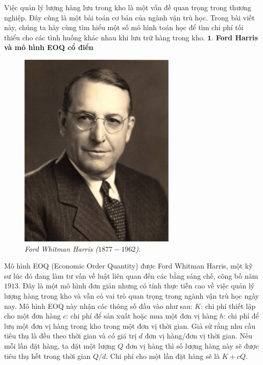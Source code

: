 \begin{multicols}{2}
	Việc quản lý lượng hàng lưu trong kho là một vấn đề quan trọng trong thương nghiệp. Đây cũng là một bài toán cơ bản của ngành vận trù học. Trong bài viết này, chúng ta hãy cùng tìm hiểu một số mô hình toán học để tìm chi phí tối thiểu cho các tình huống khác nhau khi lưu trữ hàng trong kho.
	\vskip 0.1cm
	$\pmb{1.}$ \textbf{\color{toanhocdoisong}Ford Harris và mô hình EOQ cổ điển}
	\begin{figure}[H]
		\vspace*{-5pt}
		\centering
		\captionsetup{labelformat= empty, justification=centering}
		\includegraphics[width= 0.6\linewidth]{1}
		\caption{\small\textit{\color{toanhocdoisong}Ford Whitman Harris ($1877-1962$).}}
		\vspace*{-10pt}
	\end{figure}
	Mô hình EOQ (Economic Order Quantity) được Ford Whitman Harris, một kỹ sư lúc đó đang làm tư vấn về luật liên quan đến các bằng sáng chế, công bố năm $1913$. Đây là một mô hình đơn giản nhưng có tính thực tiễn cao về việc quản lý lượng hàng trong kho và vẫn có vai trò quan trọng trong ngành vận trù học ngày nay. 
	\vskip 0.1cm
	Mô hình EOQ này nhận các thông số đầu vào như sau:
	\vskip 0.1cm
	$K$: chi phí thiết lập cho một đơn hàng
	\vskip 0.1cm
	$c$: chi phí để sản xuất hoặc mua một đơn vị hàng
	\vskip 0.1cm
	$h$: chi phí để lưu một đơn vị hàng trong kho trong một đơn vị thời gian.
	\vskip 0.1cm
	Giả sử rằng nhu cầu tiêu thụ là đều theo thời gian và có giá trị $d$ đơn vị hàng/đơn vị thời gian. Nếu mỗi lần đặt hàng, ta đặt một lượng $Q$ đơn vị hàng thì số lượng hàng này sẽ được tiêu thụ hết trong thời gian $Q/d$. Chi phí cho một lần đặt hàng sẽ là $K+cQ$.

\end{multicols}
